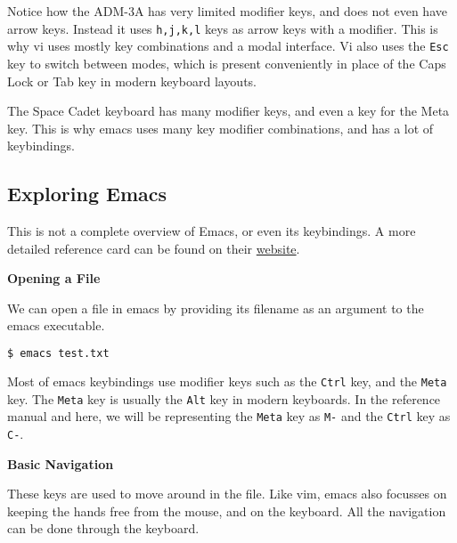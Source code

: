 Notice how the ADM-3A has very limited modifier keys, and
does not even have arrow keys. Instead it uses \lstinline|h,j,k,l|
keys as arrow keys with a modifier. This is why vi uses
mostly key combinations and a modal interface.
Vi also uses the \lstinline|Esc| key to switch between modes,
which is present conveniently in place of the Caps Lock or Tab key
in modern keyboard layouts.

The Space Cadet keyboard has many modifier keys, and even
a key for the Meta key. This is why emacs uses many key
modifier combinations, and has a lot of keybindings.

\subsection{Exploring Emacs}

This is not a complete overview of Emacs, or even its
keybindings. A more detailed reference card can be
found on their
\href{https://www.gnu.org/software/emacs/refcards/pdf/refcard.pdf}{website}.

\textbf{Opening a File}

We can open a file in emacs by providing its
filename as an argument to the emacs executable.

\begin{lstlisting}[language=bash]
$ emacs test.txt
\end{lstlisting}

Most of emacs keybindings use modifier keys such as
the \lstinline|Ctrl| key, and the \lstinline|Meta| key.
The \lstinline|Meta| key is usually the \lstinline|Alt| key
in modern keyboards. In the reference manual and here,
we will be representing the \lstinline|Meta| key as \lstinline|M-|
and the \lstinline|Ctrl| key as \lstinline|C-|.

\textbf{Basic Navigation}

These keys are used to move around in the file.
Like vim, emacs also focusses on keeping the hands
free from the mouse, and on the keyboard.
All the navigation can be done through the keyboard.

